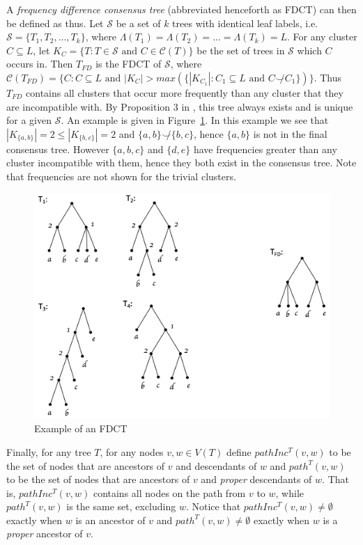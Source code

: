 \documentclass{article}
\newcommand{\compatible}{\smile}
\newcommand{\leafset}{\Lambda}
\begin{document}
    A \textit{frequency difference consensus tree} (abbreviated henceforth as FDCT) can then be defined as thus. Let $\mathcal{S}$ be a set of $k$ trees with identical leaf labels, i.e. $\mathcal{S} = \{T_1, T_2, ..., T_k\}$, where $\leafset(T_1) = \leafset(T_2) = ... = \leafset(T_k) = L$. For any cluster $C \subseteq L$, let $K_C = \{T : T \in \mathcal{S} \text{ and } C \in \mathcal{C}(T)\}$ be the set of trees in $\mathcal{S}$ which $C$ occurs in. Then $T_{FD}$ is the FDCT of $\mathcal{S}$, where $\mathcal{C}(T_{FD}) = \{C : C \subseteq L \text{ and } |K_C| > max(\{|K_{C_1}| : C_1 \subseteq L \text{ and } C \not\compatible C_1\})\}$. Thus $T_{FD}$ contains all clusters that occur more frequently than any cluster that they are incompatible with. By Proposition $3$ in \cite{steel2014axiomatic}, this tree always exists and is unique for a given $\mathcal{S}$. An example is given in Figure~\ref{fig:freqdiff}. In this example we see that $|K_{\{a, b\}}| = 2 \leq |K_{\{b, c\}}| = 2$ and $\{a, b\} \not\compatible \{b, c\}$, hence $\{a, b\}$ is not in the final consensus tree. However $\{a, b, c\}$ and $\{d, e\}$ have frequencies greater than any cluster incompatible with them, hence they both exist in the consensus tree. Note that frequencies are not shown for the trivial clusters.

    \begin{figure}[h]
        \includegraphics[scale=0.5]{freqdiff}
        \centering
        \caption{Example of an FDCT}
        \label{fig:freqdiff}
    \end{figure}

    Finally, for any tree $T$, for any nodes $v, w \in V(T)$ define $pathInc^{T}(v, w)$ to be the set of nodes that are ancestors of $v$ and descendants of $w$ and $path^{T}(v, w)$ to be the set of nodes that are ancestors of $v$ and \textit{proper} descendants of $w$. That is, $pathInc^{T}(v, w)$ contains all nodes on the path from $v$ to $w$, while $path^{T}(v, w)$ is the same set, excluding $w$. Notice that $pathInc^{T}(v, w) \neq \emptyset$ exactly when $w$ is an ancestor of $v$ and $path^{T}(v, w) \neq \emptyset$ exactly when $w$ is a \textit{proper} ancestor of $v$.
\end{document}
